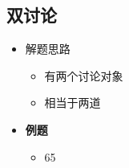   \subsection{双讨论}

    \begin{itemize}
      \item 解题思路
      \begin{itemize}
        \item 有两个讨论对象
        \item 相当于两道
      \end{itemize}

      \item \textbf{例题}
      \begin{itemize}
        \item 65
      \end{itemize}
    \end{itemize}
